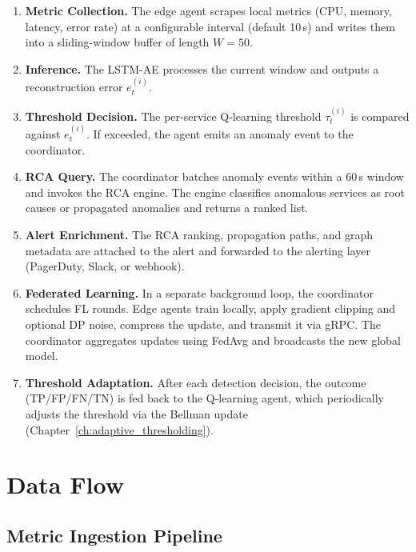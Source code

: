 \begin{enumerate}
    \item \textbf{Metric Collection.} The edge agent scrapes local metrics
    (CPU, memory, latency, error rate) at a configurable interval (default
    10\,s) and writes them into a sliding-window buffer of length $W=50$.

    \item \textbf{Inference.} The LSTM-AE processes the current window and
    outputs a reconstruction error $e_t^{(i)}$.

    \item \textbf{Threshold Decision.} The per-service Q-learning threshold
    $\tau_t^{(i)}$ is compared against $e_t^{(i)}$. If exceeded, the agent
    emits an anomaly event to the coordinator.

    \item \textbf{RCA Query.} The coordinator batches anomaly events within a
    60\,s window and invokes the RCA engine. The engine classifies anomalous
    services as root causes or propagated anomalies and returns a ranked list.

    \item \textbf{Alert Enrichment.} The RCA ranking, propagation paths, and
    graph metadata are attached to the alert and forwarded to the alerting
    layer (PagerDuty, Slack, or webhook).

    \item \textbf{Federated Learning.} In a separate background loop, the
    coordinator schedules FL rounds. Edge agents train locally, apply gradient
    clipping and optional DP noise, compress the update, and transmit it via
    gRPC. The coordinator aggregates updates using FedAvg and broadcasts the
    new global model.

    \item \textbf{Threshold Adaptation.} After each detection decision, the
    outcome (TP/FP/FN/TN) is fed back to the Q-learning agent, which
    periodically adjusts the threshold via the Bellman update
    (Chapter~\ref{ch:adaptive_thresholding}).
\end{enumerate}

\section{Data Flow}
\label{sec:design_dataflow}

\subsection{Metric Ingestion Pipeline}
\label{subsec:design_ingestion}

